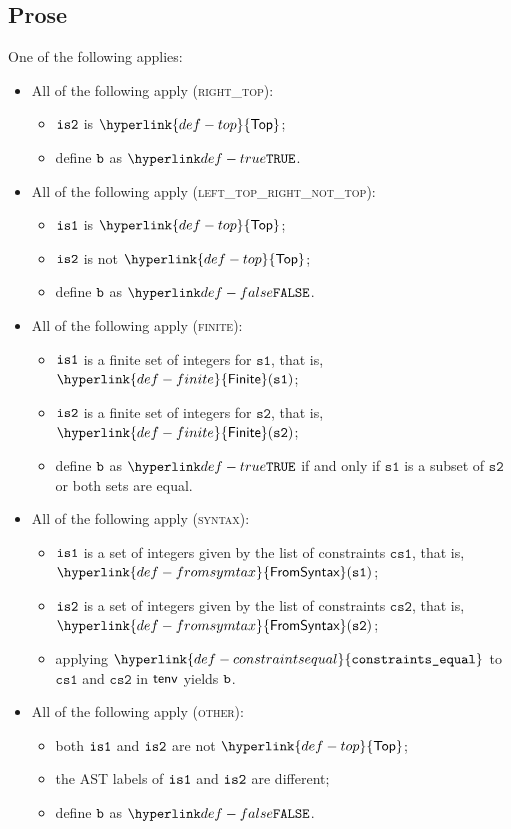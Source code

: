 \documentclass{book}
\newcommand\constraintsequal[0]{\hyperlink{def-constraintsequal}{\texttt{constraints\_equal}}}
\newcommand\Finite[0]{\hyperlink{def-finite}{\textsf{Finite}}}
\newcommand\Top[0]{\hyperlink{def-top}{\textsf{Top}}}
\newcommand\FromSyntax[0]{\hyperlink{def-fromsymtax}{\textsf{FromSyntax}}}
\newcommand\vsone[0]{\texttt{s1}}
\newcommand\vstwo[0]{\texttt{s2}}
\newcommand\csone[0]{\texttt{cs1}}
\newcommand\cstwo[0]{\texttt{cs2}}
\begin{document}
\subsection{Prose}
One of the following applies:
\begin{itemize}
  \item All of the following apply (\textsc{right\_top}):
  \begin{itemize}
    \item $\texttt{is2}$ is $\Top$;
    \item define $\texttt{b}$ as $\True$.
  \end{itemize}

  \item All of the following apply (\textsc{left\_top\_right\_not\_top}):
  \begin{itemize}
    \item $\texttt{is1}$ is $\Top$;
    \item $\texttt{is2}$ is not $\Top$;
    \item define $\texttt{b}$ as $\False$.
  \end{itemize}

  \item All of the following apply (\textsc{finite}):
  \begin{itemize}
    \item $\texttt{is1}$ is a finite set of integers for $\vsone$, that is, $\Finite(\vsone)$;
    \item $\texttt{is2}$ is a finite set of integers for $\vstwo$, that is, $\Finite(\vstwo)$;
    \item define $\texttt{b}$ as $\True$ if and only if $\vsone$ is a subset of $\vstwo$ or both sets are equal.
  \end{itemize}

  \item All of the following apply (\textsc{syntax}):
  \begin{itemize}
    \item $\texttt{is1}$ is a set of integers given by the list of constraints $\csone$, that is, \\ $\FromSyntax(\vsone)$;
    \item $\texttt{is2}$ is a set of integers given by the list of constraints $\cstwo$, that is, \\ $\FromSyntax(\vstwo)$;
    \item applying $\constraintsequal$ to $\csone$ and $\cstwo$ in $\textsf{tenv}$ yields $\texttt{b}$.
  \end{itemize}

  \item All of the following apply (\textsc{other}):
  \begin{itemize}
    \item both $\texttt{is1}$ and $\texttt{is2}$ are not $\Top$;
    \item the AST labels of $\texttt{is1}$ and $\texttt{is2}$ are different;
    \item define $\texttt{b}$ as $\False$.
  \end{itemize}
\end{itemize}
\end{document}
